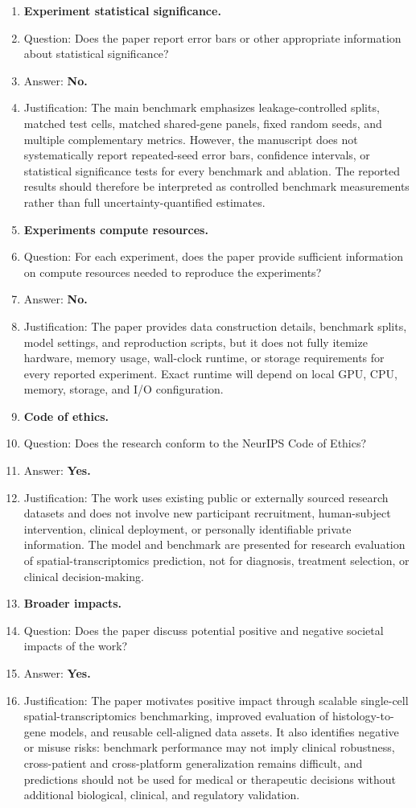 \documentclass{article}
\begin{document}
\begin{enumerate}[leftmargin=*]
\item \textbf{Experiment statistical significance.}
    \item[] Question: Does the paper report error bars or other appropriate information about statistical significance?
    \item[] Answer: \textbf{No.}
    \item[] Justification: The main benchmark emphasizes leakage-controlled splits, matched test cells, matched shared-gene panels, fixed random seeds, and multiple complementary metrics. However, the manuscript does not systematically report repeated-seed error bars, confidence intervals, or statistical significance tests for every benchmark and ablation. The reported results should therefore be interpreted as controlled benchmark measurements rather than full uncertainty-quantified estimates.

\item \textbf{Experiments compute resources.}
    \item[] Question: For each experiment, does the paper provide sufficient information on compute resources needed to reproduce the experiments?
    \item[] Answer: \textbf{No.}
    \item[] Justification: The paper provides data construction details, benchmark splits, model settings, and reproduction scripts, but it does not fully itemize hardware, memory usage, wall-clock runtime, or storage requirements for every reported experiment. Exact runtime will depend on local GPU, CPU, memory, storage, and I/O configuration.

\item \textbf{Code of ethics.}
    \item[] Question: Does the research conform to the NeurIPS Code of Ethics?
    \item[] Answer: \textbf{Yes.}
    \item[] Justification: The work uses existing public or externally sourced research datasets and does not involve new participant recruitment, human-subject intervention, clinical deployment, or personally identifiable private information. The model and benchmark are presented for research evaluation of spatial-transcriptomics prediction, not for diagnosis, treatment selection, or clinical decision-making.

\item \textbf{Broader impacts.}
    \item[] Question: Does the paper discuss potential positive and negative societal impacts of the work?
    \item[] Answer: \textbf{Yes.}
    \item[] Justification: The paper motivates positive impact through scalable single-cell spatial-transcriptomics benchmarking, improved evaluation of histology-to-gene models, and reusable cell-aligned data assets. It also identifies negative or misuse risks: benchmark performance may not imply clinical robustness, cross-patient and cross-platform generalization remains difficult, and predictions should not be used for medical or therapeutic decisions without additional biological, clinical, and regulatory validation.


\end{enumerate}
\end{document}
